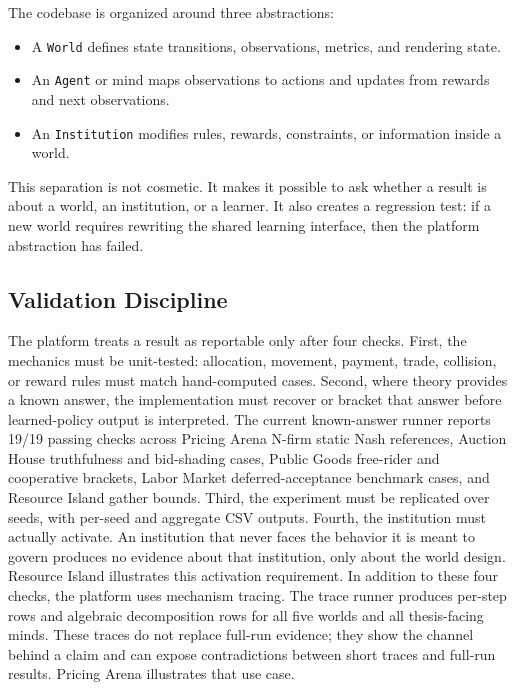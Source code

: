 \documentclass[11pt]{article}
\newcommand{\code}[1]{\texttt{#1}}
\begin{document}
The codebase is organized around three abstractions:

\begin{itemize}
  \item A \code{World} defines state transitions, observations, metrics, and
  rendering state.
  \item An \code{Agent} or mind maps observations to actions and updates from
  rewards and next observations.
  \item An \code{Institution} modifies rules, rewards, constraints, or
  information inside a world.
\end{itemize}

This separation is not cosmetic. It makes it possible to ask whether a result is
about a world, an institution, or a learner. It also creates a regression test:
if a new world requires rewriting the shared learning interface, then the
platform abstraction has failed.

\subsection{Validation Discipline}

The platform treats a result as reportable only after four checks. First, the
mechanics must be unit-tested: allocation, movement, payment, trade, collision,
or reward rules must match hand-computed cases. Second, where theory provides a
known answer, the implementation must recover or bracket that answer before
learned-policy output is interpreted. The current known-answer runner reports
19/19 passing checks across Pricing Arena N-firm static Nash references,
Auction House truthfulness and bid-shading cases, Public Goods free-rider and
cooperative brackets, Labor Market deferred-acceptance benchmark cases, and
Resource Island gather bounds. Third, the experiment must be replicated over
seeds, with per-seed and aggregate CSV outputs. Fourth, the institution must
actually activate. An institution that never faces the behavior it is meant to
govern produces no evidence about that institution, only about the world design.
Resource Island illustrates this activation requirement. In addition to these
four checks, the platform uses mechanism tracing. The trace runner produces
per-step rows and algebraic decomposition rows for all five worlds and all
thesis-facing minds. These traces do not replace full-run evidence; they show
the channel behind a claim and can expose contradictions between short traces
and full-run results. Pricing Arena illustrates that use case.
\end{document}
